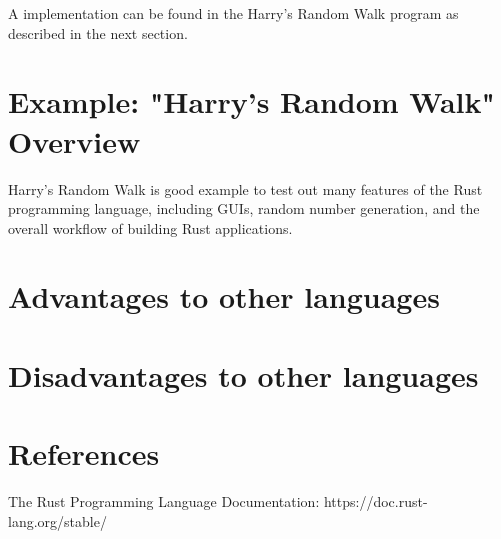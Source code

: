 \documentclass{article}
\begin{document}
A implementation can be found in the Harry's Random Walk program as described in the next section.

\section{Example: "Harry's Random Walk" Overview}
Harry's Random Walk is good example to test out many features of the Rust programming language, including GUIs, random number generation, and the overall workflow of building Rust applications.

\section{Advantages to other languages}

\section{Disadvantages to other languages}

\section{References}
The Rust Programming Language Documentation: https://doc.rust-lang.org/stable/
\end{document}
